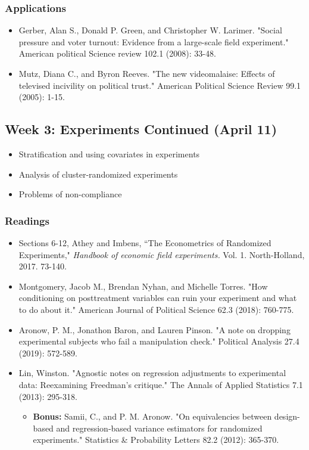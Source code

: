 \documentclass[11pt, article, oneside]{memoir}
\theoremstyle{Assumption}
\begin{document}
\subsubsection*{Applications}

\begin{itemize}
\item Gerber, Alan S., Donald P. Green, and Christopher W. Larimer. "Social pressure and voter turnout: Evidence from a large-scale field experiment." American political Science review 102.1 (2008): 33-48.
\item Mutz, Diana C., and Byron Reeves. "The new videomalaise: Effects of televised incivility on political trust." American Political Science Review 99.1 (2005): 1-15.
\end{itemize}

\subsection{Week 3: Experiments Continued (April 11)}

\begin{itemize}
\item Stratification and using covariates in experiments
\item Analysis of cluster-randomized experiments
\item Problems of non-compliance
\end{itemize}

\subsubsection*{Readings}

\begin{itemize}
\item Sections 6-12, Athey and Imbens, ``The Econometrics of Randomized Experiments,"  \textit{Handbook of economic field experiments.} Vol. 1. North-Holland, 2017. 73-140. 
\item Montgomery, Jacob M., Brendan Nyhan, and Michelle Torres. "How conditioning on posttreatment variables can ruin your experiment and what to do about it." American Journal of Political Science 62.3 (2018): 760-775.
\item Aronow, P. M., Jonathon Baron, and Lauren Pinson. "A note on dropping experimental subjects who fail a manipulation check." Political Analysis 27.4 (2019): 572-589.
\item Lin, Winston. "Agnostic notes on regression adjustments to experimental data: Reexamining Freedman’s critique." The Annals of Applied Statistics 7.1 (2013): 295-318.
\begin{itemize}
\item \textbf{Bonus:} Samii, C., and P. M. Aronow. "On equivalencies between design-based and regression-based variance estimators for randomized experiments." Statistics \& Probability Letters 82.2 (2012): 365-370.
\end{itemize}

\end{itemize}
\end{document}
